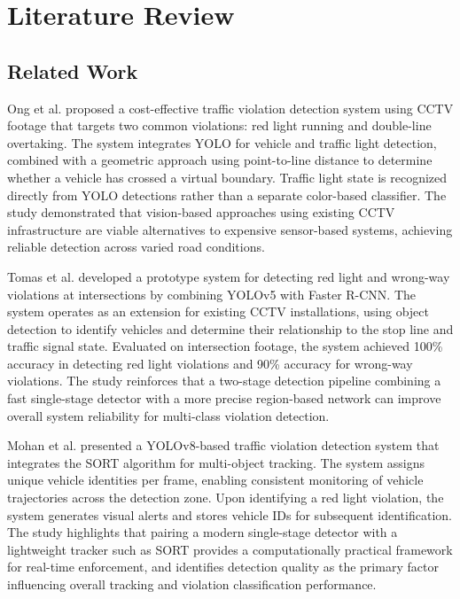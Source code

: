 \section{Literature Review}

\subsection{Related Work}

Ong et al. \cite{ong2024} proposed a cost-effective traffic violation detection system using CCTV footage that targets two common violations: red light running and double-line overtaking. The system integrates YOLO for vehicle and traffic light detection, combined with a geometric approach using point-to-line distance to determine whether a vehicle has crossed a virtual boundary. Traffic light state is recognized directly from YOLO detections rather than a separate color-based classifier. The study demonstrated that vision-based approaches using existing CCTV infrastructure are viable alternatives to expensive sensor-based systems, achieving reliable detection across varied road conditions.

Tomas et al. \cite{tomas2024} developed a prototype system for detecting red light and wrong-way violations at intersections by combining YOLOv5 with Faster R-CNN. The system operates as an extension for existing CCTV installations, using object detection to identify vehicles and determine their relationship to the stop line and traffic signal state. Evaluated on intersection footage, the system achieved 100\% accuracy in detecting red light violations and 90\% accuracy for wrong-way violations. The study reinforces that a two-stage detection pipeline combining a fast single-stage detector with a more precise region-based network can improve overall system reliability for multi-class violation detection.

Mohan et al. \cite{mohan2023} presented a YOLOv8-based traffic violation detection system that integrates the SORT algorithm for multi-object tracking. The system assigns unique vehicle identities per frame, enabling consistent monitoring of vehicle trajectories across the detection zone. Upon identifying a red light violation, the system generates visual alerts and stores vehicle IDs for subsequent identification. The study highlights that pairing a modern single-stage detector with a lightweight tracker such as SORT provides a computationally practical framework for real-time enforcement, and identifies detection quality as the primary factor influencing overall tracking and violation classification performance.

